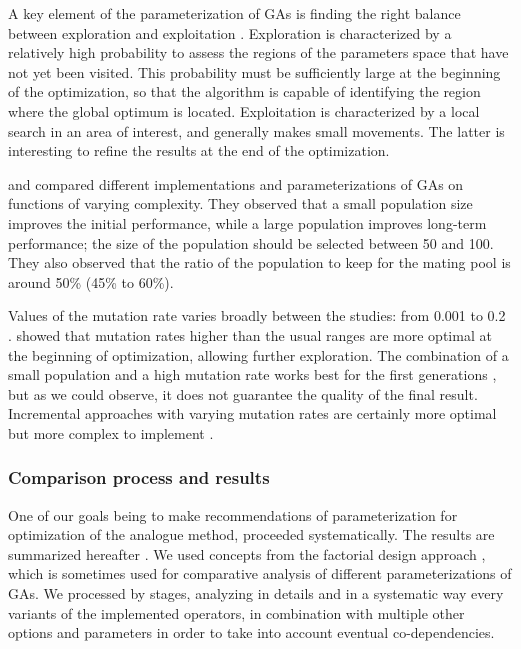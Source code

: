 \documentclass[twocol]{ametsoc}
\begin{document}
A key element of the parameterization of GAs is finding the right balance between exploration and exploitation \citep{Back1992a, Smith1997a}. Exploration is characterized by a relatively high probability to assess the regions of the parameters space that have not yet been visited. This probability must be sufficiently large at the beginning of the optimization, so that the algorithm is capable of identifying the region where the global optimum is located. Exploitation is characterized by a local search in an area of interest, and generally makes small movements. The latter is interesting to refine the results at the end of the optimization.

\citet{DeJong1975a} and \citet{Grefenstette1986} compared different implementations and parameterizations of GAs on functions of varying complexity. They observed that a small population size improves the initial performance, while a large population improves long-term performance; the size of the population should be selected between 50 and 100. They also observed that the ratio of the population to keep for the mating pool is around 50\% (45\% to 60\%).

Values of the mutation rate varies broadly between the studies: from 0.001 \citep{DeJong1975a} to 0.2 \citet{Haupt2004}. \citet{Back1996b} showed that mutation rates higher than the usual ranges are more optimal at the beginning of optimization, allowing further exploration. The combination of a small population and a high mutation rate works best for the first generations \citep{DeJong1975a, Back1996b, Haupt2004}, but as we could observe, it does not guarantee the quality of the final result. Incremental approaches with varying mutation rates are certainly more optimal but more complex to implement \citep{Back1996a, Back1996b}.


\subsubsection{Comparison process and results}

One of our goals being to make recommendations of parameterization for optimization of the analogue method, proceeded systematically. The results are summarized hereafter \citep[see][for the details]{Horton2012a}. We used concepts from the factorial design approach \citep[see eg.][]{Costa2005,Costa2007,Mariano2010}, which is sometimes used for comparative analysis of different parameterizations of GAs. We processed by stages, analyzing in details and in a systematic way every variants of the implemented operators, in combination with multiple other options and parameters in order to take into account eventual co-dependencies. 
\end{document}

